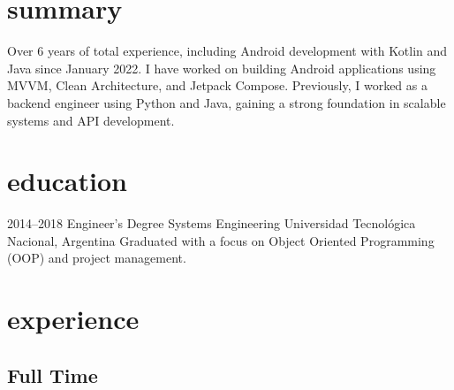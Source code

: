 \documentclass[a4paper,nocolors]{cv-friggeri-x}
\begin{document}
\section{summary}
Over 6 years of total experience, including Android development with
Kotlin and Java since January 2022. I have worked on building
Android applications using MVVM, Clean Architecture, and Jetpack
Compose. Previously, I worked as a backend engineer using Python
and Java, gaining a strong foundation in scalable systems and API
development.


\section{education}

\begin{entrylist}


\entry
{2014--2018}
{Engineer’s Degree {\normalfont Systems Engineering}}
{Universidad Tecnológica Nacional, Argentina}
{Graduated with a focus on Object Oriented Programming (OOP) and project management.}

\end{entrylist}


\section{experience}

\subsection{Full Time}
\end{document}
